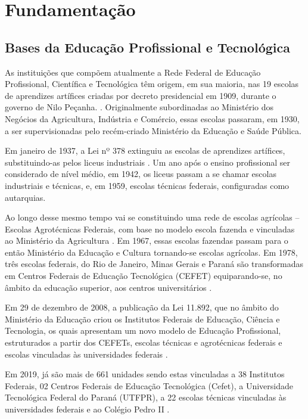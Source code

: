 \chapter{Fundamentação}
\label{fundamentacao}


\section{Bases da Educação Profissional e Tecnológica}
\label{ept}

As instituições que compõem atualmente a Rede Federal de Educação Profissional, Científica e Tecnológica têm origem, em sua maioria, nas 19 escolas de aprendizes artífices criadas por decreto presidencial em 1909, durante o governo de Nilo Peçanha. \cite{silva2009institutos}. Originalmente subordinadas ao Ministério dos Negócios da Agricultura, Indústria e Comércio, essas escolas passaram, em 1930, a ser supervisionadas pelo recém-criado Ministério da Educação e Saúde Pública.


Em janeiro de 1937, a Lei nº 378 extinguiu as escolas de aprendizes artífices, substituindo-as pelos liceus industriais \cite{candido2019era}. Um ano após o ensino profissional ser considerado de nível médio, em 1942, os liceus passam a se chamar escolas industriais e técnicas, e, em 1959, escolas técnicas federais, configuradas como autarquias.

Ao longo desse mesmo tempo vai se constituindo uma rede de escolas agrícolas – Escolas Agrotécnicas Federais, com base no modelo escola fazenda e vinculadas ao Ministério da Agricultura \cite{silva2009institutos}. Em 1967, essas escolas fazendas passam para o então Ministério da Educação e Cultura tornando-se escolas agrícolas. Em 1978, três escolas federais, do Rio de Janeiro, Minas Gerais e Paraná são transformadas em Centros Federais de Educação Tecnológica (CEFET) equiparando-se, no âmbito da educação superior, aos centros universitários \cite{silva2009institutos}.

Em 29 de dezembro de 2008, a publicação da Lei 11.892, que no âmbito do Ministério da Educação criou os Institutos Federais de Educação, Ciência e Tecnologia, os quais apresentam um novo modelo de Educação Profissional, estruturados a partir dos CEFETs, escolas técnicas e agrotécnicas federais e escolas vinculadas às universidades federais \cite{garcia2018educaccao}.


Em 2019, já são mais de 661 unidades sendo estas vinculadas a 38 Institutos Federais, 02 Centros Federais de Educação Tecnológica (Cefet), a Universidade Tecnológica Federal do Paraná (UTFPR), a 22 escolas técnicas vinculadas às universidades federais e ao Colégio Pedro II \cite{conif2023}. 

